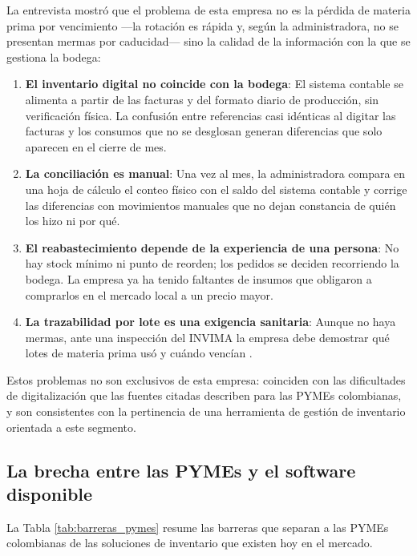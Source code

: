 La entrevista mostró que el problema de esta empresa no es la pérdida de materia prima por vencimiento ---la rotación es rápida y, según la administradora, no se presentan mermas por caducidad--- sino la calidad de la información con la que se gestiona la bodega:

\begin{enumerate}
    \item \textbf{El inventario digital no coincide con la bodega}: El sistema contable se alimenta a partir de las facturas y del formato diario de producción, sin verificación física. La confusión entre referencias casi idénticas al digitar las facturas y los consumos que no se desglosan generan diferencias que solo aparecen en el cierre de mes.
    \item \textbf{La conciliación es manual}: Una vez al mes, la administradora compara en una hoja de cálculo el conteo físico con el saldo del sistema contable y corrige las diferencias con movimientos manuales que no dejan constancia de quién los hizo ni por qué.
    \item \textbf{El reabastecimiento depende de la experiencia de una persona}: No hay stock mínimo ni punto de reorden; los pedidos se deciden recorriendo la bodega. La empresa ya ha tenido faltantes de insumos que obligaron a comprarlos en el mercado local a un precio mayor.
    \item \textbf{La trazabilidad por lote es una exigencia sanitaria}: Aunque no haya mermas, ante una inspección del INVIMA la empresa debe demostrar qué lotes de materia prima usó y cuándo vencían \cite{res2674_2013}.
\end{enumerate}

Estos problemas no son exclusivos de esta empresa: coinciden con las dificultades de digitalización que las fuentes citadas describen para las PYMEs colombianas, y son consistentes con la pertinencia de una herramienta de gestión de inventario orientada a este segmento.

\subsection{La brecha entre las PYMEs y el software disponible}

La Tabla \ref{tab:barreras_pymes} resume las barreras que separan a las PYMEs colombianas de las soluciones de inventario que existen hoy en el mercado.

